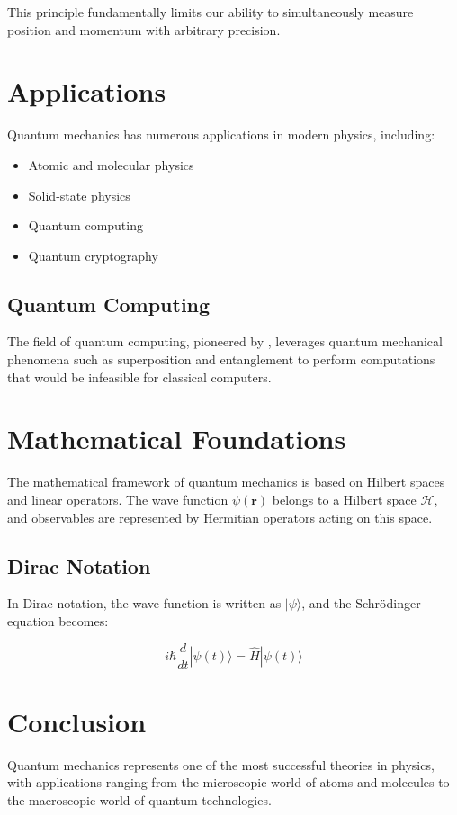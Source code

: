 This principle fundamentally limits our ability to simultaneously measure position and momentum with arbitrary precision.

\section{Applications}

Quantum mechanics has numerous applications in modern physics, including:

\begin{itemize}
\item Atomic and molecular physics
\item Solid-state physics
\item Quantum computing
\item Quantum cryptography
\end{itemize}

\subsection{Quantum Computing}

The field of quantum computing, pioneered by \cite{feynman1982}, leverages quantum mechanical phenomena such as superposition and entanglement to perform computations that would be infeasible for classical computers.

\section{Mathematical Foundations}

The mathematical framework of quantum mechanics is based on Hilbert spaces and linear operators. The wave function $\psi(\mathbf{r})$ belongs to a Hilbert space $\mathcal{H}$, and observables are represented by Hermitian operators acting on this space.

\subsection{Dirac Notation}

In Dirac notation, the wave function is written as $|\psi\rangle$, and the Schrödinger equation becomes:

\begin{equation}
i\hbar \frac{d}{dt} |\psi(t)\rangle = \hat{H} |\psi(t)\rangle
\end{equation}

\section{Conclusion}

Quantum mechanics represents one of the most successful theories in physics, with applications ranging from the microscopic world of atoms and molecules to the macroscopic world of quantum technologies.


